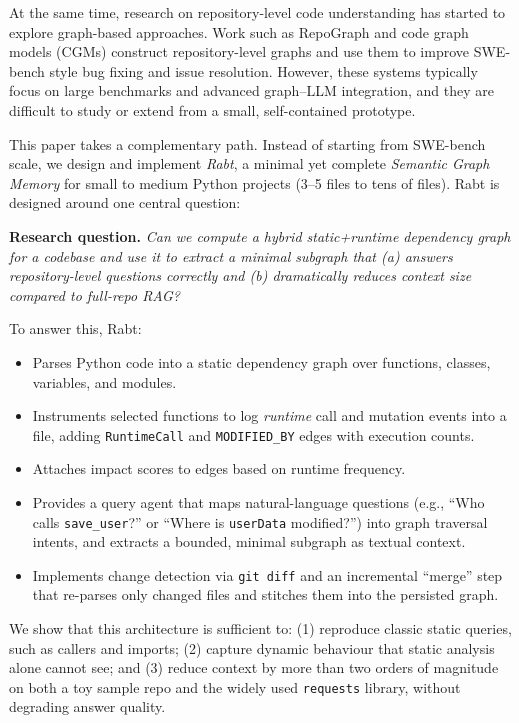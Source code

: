 \documentclass[11pt]{article}
\begin{document}
At the same time, research on repository-level code understanding has started to explore graph-based approaches.
Work such as RepoGraph and code graph models (CGMs) construct repository-level graphs and use them to improve SWE-bench style bug fixing and issue resolution.
However, these systems typically focus on large benchmarks and advanced graph--LLM integration, and they are difficult to study or extend from a small, self-contained prototype.

This paper takes a complementary path.
Instead of starting from SWE-bench scale, we design and implement \emph{Rabt}, a minimal yet complete \emph{Semantic Graph Memory} for small to medium Python projects (3--5 files to tens of files).
Rabt is designed around one central question:

\medskip
\noindent
\textbf{Research question.}
\emph{Can we compute a hybrid static+runtime dependency graph for a codebase and use it to extract a minimal subgraph that (a) answers repository-level questions correctly and (b) dramatically reduces context size compared to full-repo RAG?}

\medskip

To answer this, Rabt:
\begin{itemize}
  \item Parses Python code into a static dependency graph over functions, classes, variables, and modules.
  \item Instruments selected functions to log \emph{runtime} call and mutation events into a file, adding \texttt{RuntimeCall} and \texttt{MODIFIED\_BY} edges with execution counts.
  \item Attaches impact scores to edges based on runtime frequency.
  \item Provides a query agent that maps natural-language questions (e.g., ``Who calls \texttt{save\_user}?'' or ``Where is \texttt{userData} modified?'') into graph traversal intents, and extracts a bounded, minimal subgraph as textual context.
  \item Implements change detection via \texttt{git diff} and an incremental ``merge'' step that re-parses only changed files and stitches them into the persisted graph.
\end{itemize}

We show that this architecture is sufficient to:
(1) reproduce classic static queries, such as callers and imports;
(2) capture dynamic behaviour that static analysis alone cannot see; and
(3) reduce context by more than two orders of magnitude on both a toy sample repo and the widely used \texttt{requests} library, without degrading answer quality.
\end{document}

